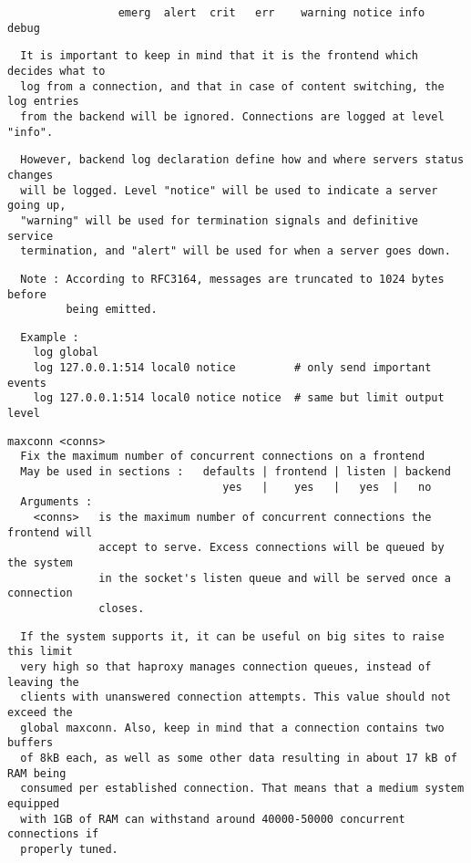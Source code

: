 \begin{verbatim}
                 emerg  alert  crit   err    warning notice info  debug
\end{verbatim}

\begin{verbatim}
  It is important to keep in mind that it is the frontend which decides what to
  log from a connection, and that in case of content switching, the log entries
  from the backend will be ignored. Connections are logged at level "info".
\end{verbatim}

\begin{verbatim}
  However, backend log declaration define how and where servers status changes
  will be logged. Level "notice" will be used to indicate a server going up,
  "warning" will be used for termination signals and definitive service
  termination, and "alert" will be used for when a server goes down.
\end{verbatim}

\begin{verbatim}
  Note : According to RFC3164, messages are truncated to 1024 bytes before
         being emitted.
\end{verbatim}

\begin{verbatim}
  Example :
    log global
    log 127.0.0.1:514 local0 notice         # only send important events
    log 127.0.0.1:514 local0 notice notice  # same but limit output level
\end{verbatim}

\begin{verbatim}
maxconn <conns>
  Fix the maximum number of concurrent connections on a frontend
  May be used in sections :   defaults | frontend | listen | backend
                                 yes   |    yes   |   yes  |   no
  Arguments :
    <conns>   is the maximum number of concurrent connections the frontend will
              accept to serve. Excess connections will be queued by the system
              in the socket's listen queue and will be served once a connection
              closes.
\end{verbatim}

\begin{verbatim}
  If the system supports it, it can be useful on big sites to raise this limit
  very high so that haproxy manages connection queues, instead of leaving the
  clients with unanswered connection attempts. This value should not exceed the
  global maxconn. Also, keep in mind that a connection contains two buffers
  of 8kB each, as well as some other data resulting in about 17 kB of RAM being
  consumed per established connection. That means that a medium system equipped
  with 1GB of RAM can withstand around 40000-50000 concurrent connections if
  properly tuned.
\end{verbatim}

